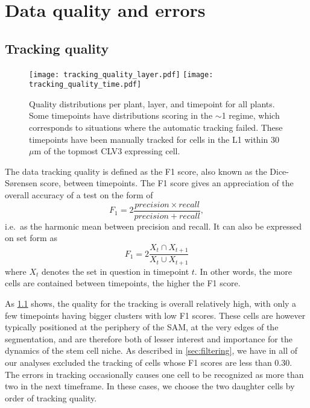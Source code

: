 

\ifpdf
\graphicspath{{Appendix1/Figs/Raster/}{Appendix1/Figs/PDF/}{Appendix1/Figs/}}
\else
\graphicspath{{Appendix1/Figs/Vector/}{Appendix1/Figs/}}
\fi

\chapter{Data quality and errors} 
\section{Tracking quality}
\label{sec:data_errors}
\begin{figure}[p]
    \centering
        \centering
        \texttt{[image: tracking\_quality\_layer.pdf]}
        \centering
        \texttt{[image: tracking\_quality\_time.pdf]} %
        \caption[Tracking quality]{Quality distributions per plant, layer, and timepoint
          for all plants.
        Some timepoints have distributions scoring in the $\sim$1 regime, which
        corresponds to situations where the automatic tracking failed. These
        timepoints have been manually tracked for cells in the L1 within 30
        $\mu$m of the topmost CLV3 expressing cell.}
      \label{fig:tracking_quality}
\end{figure}
The data tracking quality is defined as the F1 score, also known as the
Dice-S{\o}rensen score, between timepoints. The
F1 score gives an appreciation of the overall accuracy of a test on the form of
\begin{equation}
  F_1 = 2 \frac{precision\times recall}{precision + recall},
  \label{eq:f1}
\end{equation}
i.e.\ as the harmonic mean between precision and recall. It can also be
expressed on set form as 
\begin{equation}
  F_1 = 2 \frac{X_t \cap X_{t+1}}{X_t \cup X_{t+1}}
  \label{eq:f1_set}
\end{equation}
where $X_t$ denotes the set in question in timepoint $t$. In other words, the more cells are
contained between timepoints, the higher the F1 score.

As \cref{fig:tracking_quality} shows, the quality for the tracking is overall
relatively high, with only a few timepoints having bigger clusters with low F1
scores. These cells are however typically positioned at the periphery of the
SAM, at the very edges of the segmentation, and are therefore both of lesser
interest and importance for the dynamics of the stem cell niche. As described in
\cref{sec:filtering}, we have in all of our analyses excluded the tracking of
cells whose F1 scores are less than $0.30$. The errors in tracking occasionally
causes one cell to be recognized as more than two in the next timeframe. In
these cases, we choose the two daughter cells by order of tracking quality.

